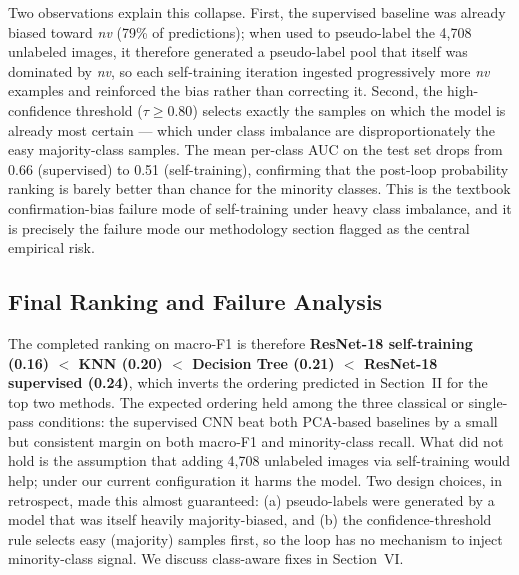 \documentclass[conference]{IEEEtran}
\begin{document}
Two observations explain this collapse. First, the supervised baseline
was already biased toward \emph{nv} (79\% of predictions); when used
to pseudo-label the 4{,}708 unlabeled images, it therefore generated
a pseudo-label pool that itself was dominated by \emph{nv}, so each
self-training iteration ingested progressively more \emph{nv}
examples and reinforced the bias rather than correcting it. Second,
the high-confidence threshold ($\tau \geq 0.80$) selects exactly the
samples on which the model is already most certain --- which under
class imbalance are disproportionately the easy majority-class
samples. The mean per-class AUC on the test set drops from 0.66
(supervised) to 0.51 (self-training), confirming that the post-loop
probability ranking is barely better than chance for the minority
classes. This is the textbook confirmation-bias failure mode of
self-training under heavy class imbalance, and it is precisely the failure mode our methodology section flagged as the central empirical risk.

\subsection{Final Ranking and Failure Analysis}
The completed ranking on macro-F1 is therefore
\textbf{ResNet-18 self-training (0.16) $<$ KNN (0.20) $<$ Decision Tree
(0.21) $<$ ResNet-18 supervised (0.24)}, which inverts the ordering
predicted in Section~II for the top two methods. The expected ordering
held among the three classical or single-pass conditions: the supervised
CNN beat both PCA-based baselines by a small but consistent margin on
both macro-F1 and minority-class recall. What did not hold is the
assumption that adding 4{,}708 unlabeled images via self-training would
help; under our current configuration it harms the model. Two design
choices, in retrospect, made this almost guaranteed: (a) pseudo-labels
were generated by a model that was itself heavily majority-biased, and
(b) the confidence-threshold rule selects easy (majority) samples first,
so the loop has no mechanism to inject minority-class signal. We discuss
class-aware fixes in Section~VI.
\end{document}
